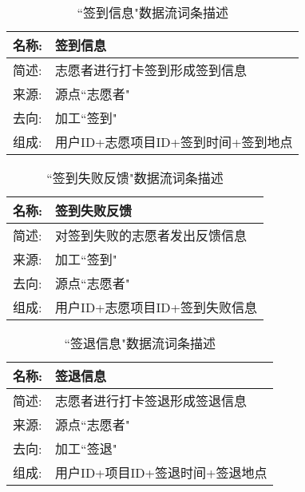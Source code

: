 \begin{table}[H]  
    \caption{``签到信息"数据流词条描述}  
    \begin{center}  
        \begin{tabular}{l p{11cm}} 
            \hline
            \quad 名称: & 签到信息 \\
            \hline
            \quad 简述: & 志愿者进行打卡签到形成签到信息 \\
            \hline
            \quad 来源: & 源点``志愿者" \\
            \hline
            \quad 去向: & 加工``签到" \\
            \hline
            \quad 组成: & 用户ID+志愿项目ID+签到时间+签到地点  \\
            \hline
        \end{tabular}
        \label{tab1}
    \end{center}
    \end{table}


\begin{table}[H]  
    \caption{``签到失败反馈"数据流词条描述}  
    \begin{center}  
        \begin{tabular}{l p{11cm}} 
            \hline
            \quad 名称: & 签到失败反馈 \\
            \hline
            \quad 简述: & 对签到失败的志愿者发出反馈信息 \\
            \hline
            \quad 来源: & 加工``签到" \\
            \hline
            \quad 去向: & 源点``志愿者" \\
            \hline
            \quad 组成: & 用户ID+志愿项目ID+签到失败信息  \\
            \hline
        \end{tabular}
        \label{tab1}
    \end{center}
    \end{table}


\begin{table}[H]  
    \caption{``签退信息"数据流词条描述}  
    \begin{center}  
        \begin{tabular}{l p{11cm}} 
            \hline
            \quad 名称: & 签退信息 \\
            \hline
            \quad 简述: & 志愿者进行打卡签退形成签退信息 \\
            \hline
            \quad 来源: & 源点``志愿者" \\
            \hline
            \quad 去向: & 加工``签退" \\
            \hline
            \quad 组成: & 用户ID+项目ID+签退时间+签退地点  \\
            \hline
        \end{tabular}
        \label{tab1}
    \end{center}
    \end{table}


